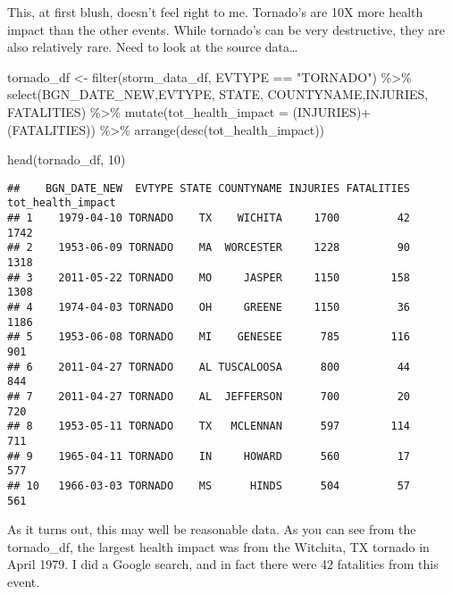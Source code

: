 \documentclass[
]{article}
\newenvironment{Shaded}{\begin{snugshade}}{\end{snugshade}}
\newcommand{\AttributeTok}[1]{\textcolor[rgb]{0.77,0.63,0.00}{#1}}
\newcommand{\DecValTok}[1]{\textcolor[rgb]{0.00,0.00,0.81}{#1}}
\newcommand{\FunctionTok}[1]{\textcolor[rgb]{0.00,0.00,0.00}{#1}}
\newcommand{\NormalTok}[1]{#1}
\newcommand{\OtherTok}[1]{\textcolor[rgb]{0.56,0.35,0.01}{#1}}
\newcommand{\SpecialCharTok}[1]{\textcolor[rgb]{0.00,0.00,0.00}{#1}}
\newcommand{\StringTok}[1]{\textcolor[rgb]{0.31,0.60,0.02}{#1}}
\begin{document}
This, at first blush, doesn't feel right to me. Tornado's are 10X more
health impact than the other events. While tornado's can be very
destructive, they are also relatively rare. Need to look at the source
data\ldots{}

\begin{Shaded}
\begin{Highlighting}[]
\NormalTok{tornado\_df }\OtherTok{\textless{}{-}}   \FunctionTok{filter}\NormalTok{(storm\_data\_df, EVTYPE }\SpecialCharTok{==} \StringTok{"TORNADO"}\NormalTok{) }\SpecialCharTok{\%\textgreater{}\%}  
                \FunctionTok{select}\NormalTok{(BGN\_DATE\_NEW,EVTYPE, STATE, COUNTYNAME,INJURIES, FATALITIES)  }\SpecialCharTok{\%\textgreater{}\%}
                \FunctionTok{mutate}\NormalTok{(}\AttributeTok{tot\_health\_impact =}\NormalTok{ (INJURIES)}\SpecialCharTok{+}\NormalTok{ (FATALITIES))                 }\SpecialCharTok{\%\textgreater{}\%} 
                \FunctionTok{arrange}\NormalTok{(}\FunctionTok{desc}\NormalTok{(tot\_health\_impact))}

\FunctionTok{head}\NormalTok{(tornado\_df, }\DecValTok{10}\NormalTok{)}
\end{Highlighting}
\end{Shaded}

\begin{verbatim}
##    BGN_DATE_NEW  EVTYPE STATE COUNTYNAME INJURIES FATALITIES tot_health_impact
## 1    1979-04-10 TORNADO    TX    WICHITA     1700         42              1742
## 2    1953-06-09 TORNADO    MA  WORCESTER     1228         90              1318
## 3    2011-05-22 TORNADO    MO     JASPER     1150        158              1308
## 4    1974-04-03 TORNADO    OH     GREENE     1150         36              1186
## 5    1953-06-08 TORNADO    MI    GENESEE      785        116               901
## 6    2011-04-27 TORNADO    AL TUSCALOOSA      800         44               844
## 7    2011-04-27 TORNADO    AL  JEFFERSON      700         20               720
## 8    1953-05-11 TORNADO    TX   MCLENNAN      597        114               711
## 9    1965-04-11 TORNADO    IN     HOWARD      560         17               577
## 10   1966-03-03 TORNADO    MS      HINDS      504         57               561
\end{verbatim}

As it turns out, this may well be reasonable data. As you can see from
the tornado\_df, the largest health impact was from the Witchita, TX
tornado in April 1979. I did a Google search, and in fact there were 42
fatalities from this event.
\end{document}
